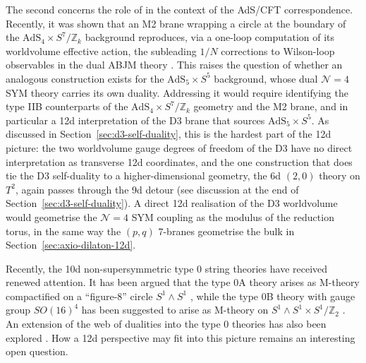 The second concerns the role of \SLZ{} in the context of the AdS/CFT correspondence.
Recently, it was shown that an M2 brane wrapping a circle at the boundary of the $\mathrm{AdS}_4 \times S^7/\mathbb{Z}_k$ background reproduces, via a one-loop computation of its worldvolume effective action, the subleading $1/N$ corrections to Wilson-loop observables in the dual ABJM theory \cite{Giombi:2023vzu, Tseytlin:2024euk}.
This raises the question of whether an analogous construction exists for the $\mathrm{AdS}_5 \times S^5$ background, whose dual $\mathcal{N}=4$ SYM theory carries its own \SLZ{} duality.
Addressing it would require identifying the type IIB counterparts of the $\mathrm{AdS}_4 \times S^7/\mathbb{Z}_k$ geometry and the M2 brane, and in particular a 12d interpretation of the D3 brane that sources $\mathrm{AdS}_5 \times S^5$.
As discussed in Section~\ref{sec:d3-self-duality}, this is the hardest part of the 12d picture: the two worldvolume gauge degrees of freedom of the D3 have no direct interpretation as transverse 12d coordinates, and the one construction that does tie the D3 self-duality to a higher-dimensional geometry, the 6d $(2,0)$ theory on $T^2$, again passes through the 9d detour (see discussion at the end of Section~\ref{sec:d3-self-duality}).
A direct 12d realisation of the D3 worldvolume \SLZ{} would geometrise the $\mathcal{N}=4$ SYM coupling as the modulus of the reduction torus, in the same way the $(p,q)$ 7-branes geometrise the bulk \SLZ{} in Section~\ref{sec:axio-dilaton-12d}.


Recently, the 10d non-supersymmetric type 0 string theories have received renewed attention.
It has been argued that the type 0A theory arises as M-theory compactified on a ``figure-8'' circle $S^1 \wedge S^1$ \cite{Baykara:2026gem}, while the type 0B theory with gauge group $SO(16)^4$ has been suggested to arise as M-theory on $S^1 \wedge S^1 \times S^1 / \mathbb{Z}_2$ \cite{Altavista:2026evd}.
An extension of the web of dualities into the type 0 theories has also been explored \cite{Baykara:2026gem, Baykara:2026vdc}.
How a 12d perspective may fit into this picture remains an interesting open question.